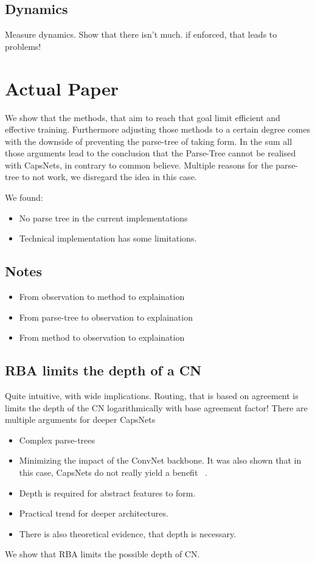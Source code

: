 \documentclass{article}
\begin{document}
\subsection*{Dynamics}
Measure dynamics. Show that there isn't much. if enforced, that leads to problems!


\section{Actual Paper}
We show that the methods, that aim to reach that goal limit efficient and effective training.
Furthermore adjusting those methods to a certain degree comes with the downside of preventing the parse-tree of taking form.
In the sum all those arguments lead to the conclusion that the Parse-Tree cannot be realised with CapsNets, in contrary to common believe.
Multiple reasons for the parse-tree to not work, we disregard the idea in this case.

We found:
\begin{itemize}
	\item No parse tree in the current implementations
	\item Technical implementation has some limitations.
\end{itemize}


\subsection{Notes}
\begin{itemize}
	\item From observation to method to explaination
	\item From parse-tree to observation to explaination
	\item From method to observation to explaination
\end{itemize}

\subsection{RBA limits the depth of a CN}


Quite intuitive, with wide implications.
Routing, that is based on agreement is limits the depth of the CN logarithmically with base agreement factor!
There are multiple arguments for deeper CapsNets
\begin{itemize}
	\item Complex parse-trees
	\item Minimizing the impact of the ConvNet backbone. It was also shown that in this case, CapsNets do not really yield a benefit ~\cite{acml/PaikKK19}.
	\item Depth is required for abstract features to form.
	\item Practical trend for deeper architectures.
	\item There is also theoretical evidence, that depth is necessary.
\end{itemize}
We show that RBA limits the possible depth of CN.
\end{document}
